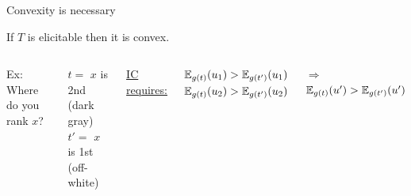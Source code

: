\begin{frame}{Convexity is necessary}{}

\begin{proposition}
If $T$ is elicitable then it is convex.
\end{proposition}



\begin{columns}

Ex: Where do you rank $x$?\\
\smallskip

$t=$ $x$ is 2nd (dark gray)\\
$t'=$ $x$ is 1st (off-white)\\
\medskip

\underline{IC requires:}

\smallskip

$\mathbb{E}_{g(t)}(u_1) > \mathbb{E}_{g(t')}(u_1)$\\
$\mathbb{E}_{g(t)}(u_2) > \mathbb{E}_{g(t')}(u_2)$\\
\bigskip

$\Longrightarrow ~$ $\mathbb{E}_{g(t)}(u') > \mathbb{E}_{g(t')}(u')$\\


\end{columns}
\end{frame}
